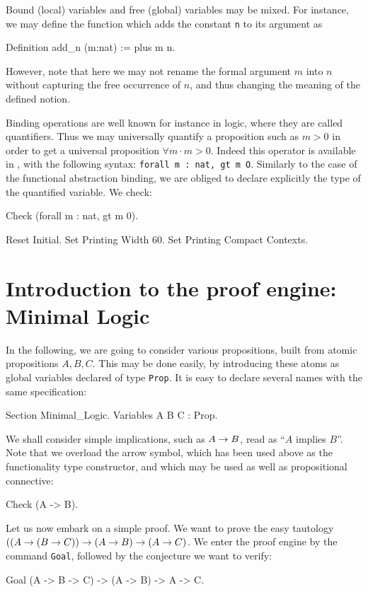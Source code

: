 \documentclass[11pt,a4paper]{book}
\begin{document}
Bound (local) variables and free (global) variables may be mixed.
For instance, we may define the function which adds the constant \verb:n:
to its argument as
\begin{coq_example}
Definition add_n (m:nat) := plus m n.
\end{coq_example}
However, note that here we may not rename the formal argument $m$ into $n$
without capturing the free occurrence of $n$, and thus changing the meaning
of the defined notion.

Binding operations are well known for instance in logic, where they
are called quantifiers.  Thus we may universally quantify a
proposition such as $m>0$ in order to get a universal proposition
$\forall m\cdot m>0$. Indeed this operator is available in \Coq, with
the following syntax: \texttt{forall m : nat, gt m O}. Similarly to the
case of the functional abstraction binding, we are obliged to declare
explicitly the type of the quantified variable. We check:
\begin{coq_example}
Check (forall m : nat, gt m 0).
\end{coq_example}

\begin{coq_eval}
Reset Initial.
Set Printing Width 60.
Set Printing Compact Contexts.
\end{coq_eval}

\section{Introduction to the proof engine: Minimal Logic}

In the following, we are going to consider various propositions, built
from atomic propositions $A, B, C$. This may be done easily, by
introducing these atoms as global variables declared of type \verb:Prop:.
It is easy to declare several names with the same specification:
\begin{coq_example}
Section Minimal_Logic.
Variables A B C : Prop.
\end{coq_example}

We shall consider simple implications, such as $A\rightarrow B$, read as
``$A$ implies $B$''. Note that we overload the arrow symbol, which
has been used above as the functionality type constructor, and which
may be used as well as propositional connective:
\begin{coq_example}
Check (A -> B).
\end{coq_example}

Let us now embark on a simple proof. We want to prove the easy tautology
$((A\rightarrow (B\rightarrow C))\rightarrow (A\rightarrow B)\rightarrow (A\rightarrow C)$.
We enter the proof engine by the command
\verb:Goal:, followed by the conjecture we want to verify:
\begin{coq_example}
Goal (A -> B -> C) -> (A -> B) -> A -> C.
\end{coq_example}
\end{document}
